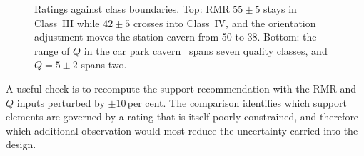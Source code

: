 \begin{figure}[htbp]
\centering
{}
\caption{Ratings against class boundaries. Top: RMR $55 \pm 5$ stays in Class~III while $42 \pm 5$ crosses into Class~IV, and the orientation adjustment moves the station cavern from 50 to 38. Bottom: the range of $Q$ in the car park cavern~\citep{pells2002developments} spans seven quality classes, and $Q = 5 \pm 2$ spans two.}
\label{fig:rating-uncertainty}
\end{figure}

A useful check is to recompute the support recommendation with the RMR and
$Q$ inputs perturbed by $\pm 10$\,per cent. The comparison identifies which
support elements are governed by a rating that is itself poorly constrained,
and therefore which additional observation would most reduce the uncertainty
carried into the design.

\chapterreferences
